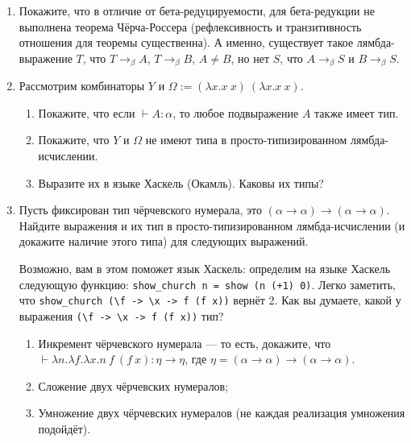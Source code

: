 \documentclass[10pt,a4paper,oneside]{article}
\begin{document}
\begin{enumerate}
\item Покажите, что в отличие от бета-редуцируемости, для бета-редукции не выполнена теорема Чёрча-Россера
(рефлексивность и транзитивность отношения для теоремы существенна).
А именно, существует такое лямбда-выражение $T$, что $T \rightarrow_\beta A$, $T \rightarrow_\beta B$,
$A \ne B$, но нет $S$, что $A \rightarrow_\beta S$ и $B \rightarrow_\beta S$.
\item Рассмотрим комбинаторы $Y$ и $\Omega := (\lambda x.x\ x)\ (\lambda x.x\ x)$.
\begin{enumerate}
\item Покажите, что если $\vdash A : \alpha$, то любое подвыражение $A$ также имеет тип.
\item Покажите, что $Y$ и $\Omega$ не имеют типа в просто-типизированном лямбда-исчислении.
\item Выразите их в языке Хаскель (Окамль). Каковы их типы?
\end{enumerate}


\item Пусть фиксирован тип чёрчевского нумерала, это $(\alpha\rightarrow\alpha)\rightarrow(\alpha\rightarrow\alpha)$.
Найдите выражения и их тип в просто-типизированном лямбда-исчислении (и докажите наличие этого типа) для следующих выражений.

Возможно, вам в этом поможет язык Хаскель: определим на языке Хаскель следующую функцию: \verb!show_church n = show (n (+1) 0)!.
Легко заметить, что \verb!show_church (\f -> \x -> f (f x))! вернёт 2. Как вы думаете, какой у выражения \verb!(\f -> \x -> f (f x))! тип?

\begin{enumerate}
\item Инкремент чёрчевского нумерала --- то есть, докажите, что
$\vdash \lambda n.\lambda f.\lambda x.n\ f\ (f\ x) : \eta\rightarrow\eta$, 
где $\eta = (\alpha\rightarrow\alpha)\rightarrow(\alpha\rightarrow\alpha)$.
\item Сложение двух чёрчевских нумералов;
\item Умножение двух чёрчевских нумералов (не каждая реализация умножения подойдёт).
\end{enumerate}



\end{enumerate}
\end{document}
